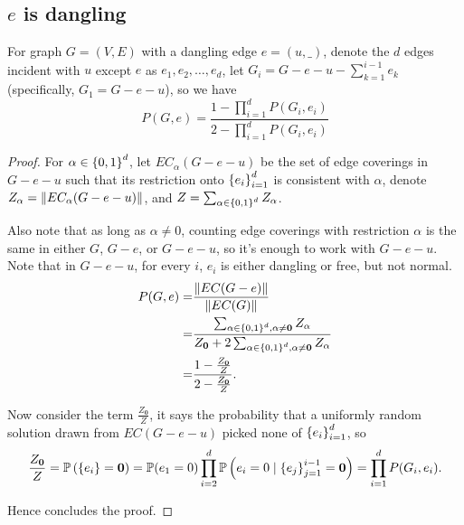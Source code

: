 \subsection{$e$ is dangling}
\begin{Prop}
For graph $G=(V,E)$ with a dangling edge $e=(u,\_)$, denote the $d$
edges incident with $u$ except $e$ as $e_1, e_2, \ldots, e_d$,
let $G_i = G - e - u - \sum_{k=1}^{i-1} e_k$ (specifically, $G_1 = G - e - u$), so we have%
	\begin{equation}
		P(G, e) = \frac{1-\prod_{i=1}^d P(G_i, e_i)}{2 - \prod_{i=1}^d P(G_i, e_i)} %
		\label{propp3rg}
	\end{equation}
\end{Prop}
\begin{proof}
	For $\alpha \in \left\{0,1\right\}^d$, let $EC_{\alpha}(G-e-u)$ be the set of edge coverings in $G-e-u$ such that its restriction onto $\left\{e_i\right\}_{i=1}^{d}$ is consistent with $\alpha$, denote $Z_{\alpha} = \left\Vert EC_{\alpha}(G-e-u)\right\Vert$, and $Z = \sum_{\alpha \in \left\{0,1\right\}^d} Z_{\alpha}$. %

		Also note that as long as $\alpha \neq 0$, counting edge coverings with restriction $\alpha$ is the same in either $G$, $G-e$, or $G-e-u$, so it's enough to work with $G-e-u$. Note that in $G-e-u$, for every $i$, $e_i$ is either dangling or free, but not normal.
	\begin{align*}
		P(G,e) = & \frac{\left\Vert EC(G-e)\right\Vert}{\left\Vert EC(G)\right\Vert} \\
		=& \frac{\sum_{\alpha \in \left\{0,1\right\}^d, \alpha \neq \mathbf{0}} Z_{\alpha} }{ Z_{\mathbf{0}} + 2 \sum_{\alpha \in \left\{0,1\right\}^d, \alpha \neq \mathbf{0}} Z_{\alpha}} \\
		=& \frac{1 - \frac{Z_{\mathbf{0}}}{Z}}{ 2 - \frac{Z_{\mathbf{0}}}{Z}}.
	\end{align*}

	Now consider the term $\frac{Z_{\mathbf{0}}}{Z}$, it says the probability that a uniformly random solution drawn from $EC(G-e-u)$ picked none of $\left\{e_i\right\}_{i=1}^{d}$, so
	\begin{align*}
		\frac{Z_{\mathbf{0}}}{Z}=\mathbb{P} \left( \left\{e_i\right\} = \mathbf{0}\right) = \mathbb{P} (e_1 = 0) \prod_{i=2}^d \mathbb{P} \left(e_i = 0 \mid \left\{e_j\right\}_{j=1}^{i-1} = \mathbf{0}\right) = \prod_{i=1}^d P(G_i, e_i).
	\end{align*}

	Hence concludes the proof.
	
\end{proof}

